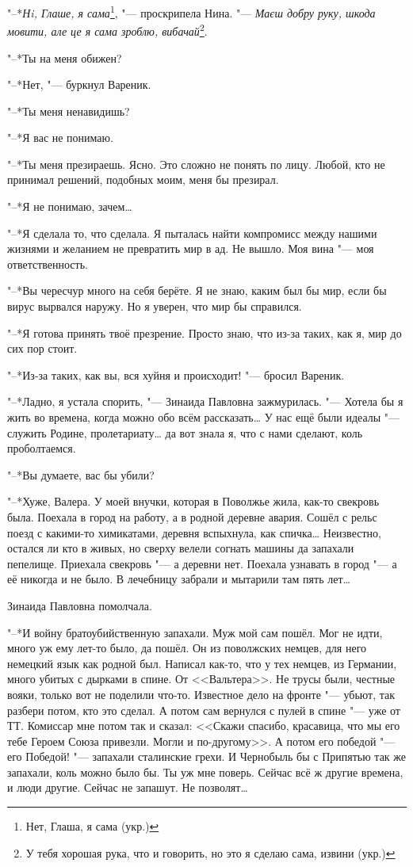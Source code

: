 "--*\textit{Нi, Глаше, я сама}\footnote{Нет, Глаша, я сама (укр.)}, "--- проскрипела Нина.
"--- \textit{Маєш добру руку, шкода мовити, але це я сама зроблю, вибачай}\footnote{У тебя хорошая рука, что и говорить, но это я сделаю сама, извини (укр.)}.

\asterism

"--*Ты на меня обижен?

"--*Нет, "--- буркнул Вареник.

"--*Ты меня ненавидишь?

"--*Я вас не понимаю.

"--*Ты меня презираешь.
Ясно.
Это сложно не понять по лицу.
Любой, кто не принимал решений, подобных моим, меня бы презирал.

"--*Я не понимаю, зачем\dots{}

"--*Я сделала то, что сделала.
Я пыталась найти компромисс между нашими жизнями и желанием не превратить мир в ад.
Не вышло.
Моя вина "--- моя ответственность.

"--*Вы чересчур много на себя берёте.
Я не знаю, каким был бы мир, если бы вирус вырвался наружу.
Но я уверен, что мир бы справился.

"--*Я готова принять твоё презрение.
Просто знаю, что из-за таких, как я, мир до сих пор стоит.

"--*Из-за таких, как вы, вся хуйня и происходит! "--- бросил Вареник.

"--*Ладно, я устала спорить, "--- Зинаида Павловна зажмурилась.
"--- Хотела бы я жить во времена, когда можно обо всём рассказать\dots{}
У нас ещё были идеалы "--- служить Родине, пролетариату\dots{} да вот знала я, что с нами сделают, коль проболтаемся.

"--*Вы думаете, вас бы убили?

"--*Хуже, Валера.
У моей внучки, которая в Поволжье жила, как-то свекровь была.
Поехала в город на работу, а в родной деревне авария.
Сошёл с рельс поезд с какими-то химикатами, деревня вспыхнула, как спичка\dots{}
Неизвестно, остался ли кто в живых, но сверху велели согнать машины да запахали пепелище.
Приехала свекровь "--- а деревни нет.
Поехала узнавать в город "--- а её никогда и не было.
В лечебницу забрали и мытарили там пять лет\dots{}

Зинаида Павловна помолчала.

"--*И войну братоубийственную запахали.
Муж мой сам пошёл.
Мог не идти, много уж ему лет-то было, да пошёл.
Он из поволжских немцев, для него немецкий язык как родной был.
Написал как-то, что у тех немцев, из Германии, много убитых с дырками в спине.
От <<Вальтера>>.
Не трусы были, честные вояки, только вот не поделили что-то.
Известное дело на фронте "--- убьют, так разбери потом, кто это сделал.
А потом сам вернулся с пулей в спине "--- уже от ТТ.
Комиссар мне потом так и сказал: <<Скажи спасибо, красавица, что мы его тебе Героем Союза привезли.
Могли и по-другому>>.
А потом его победой "--- его Победой! "--- запахали сталинские грехи.
И Чернобыль бы с Припятью так же запахали, коль можно было бы.
Ты уж мне поверь.
Сейчас всё ж другие времена, и люди другие.
Сейчас не запашут.
Не позволят\dots{}


